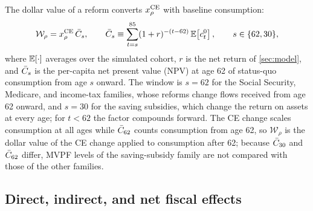 The dollar value of a reform converts $x^{\mathrm{CE}}_{\rho}$ with baseline consumption:
\begin{equation}\label{eq:wtp}
\mathcal{W}_{\rho}=x^{\mathrm{CE}}_{\rho}\,\bar{C}_{s},
\qquad
\bar{C}_{s}\equiv\sum_{t=s}^{85}(1+r)^{-(t-62)}\,{\mathbb E}\!\left[c^{0}_{t}\right],
\qquad s\in\{62,30\},
\end{equation}
where ${\mathbb E}[\cdot]$ averages over the simulated cohort, $r$ is the net return of \autoref{sec:model}, and $\bar{C}_{s}$ is the per-capita net present value (NPV) at age 62 of status-quo consumption from age $s$ onward. The window is $s=62$ for the Social Security, Medicare, and income-tax families, whose reforms change flows received from age 62 onward, and $s=30$ for the saving subsidies, which change the return on assets at every age; for $t<62$ the factor compounds forward.
The CE change scales consumption at all ages while $\bar{C}_{62}$ counts consumption from age 62, so $\mathcal{W}_{\rho}$ is the dollar value of the CE change applied to consumption after 62; because $\bar{C}_{30}$ and $\bar{C}_{62}$ differ, MVPF levels of the saving-subsidy family are not compared with those of the other families.

\subsection{Direct, indirect, and net fiscal effects}\label{sec:fiscal}

